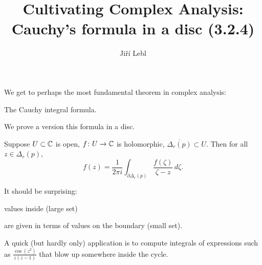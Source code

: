 \documentclass[10pt,aspectratio=169]{beamer}
\author{Ji\v{r}\'i Lebl}
\institute[OSU]{%
Departemento pri Matematiko de Oklahoma {\^S}tata Universitato}
\title{Cultivating Complex Analysis:\\%
Cauchy's formula in a disc (3.2.4)}
\date{}
\begin{document}
\begin{frame}
\titlepage
\end{frame}

\begin{frame}

We get to perhaps the most fundamental theorem in complex analysis:

The Cauchy integral formula.

\pause
\medskip

We prove a version this formula in a disc.

\pause
\medskip

\begin{theorem}
Suppose $U \subset {\mathbb{C}}$ is open, $f \colon U \to {\mathbb{C}}$ is holomorphic,
$\overline{\Delta_r(p)} \subset U$.
Then for all $z \in \Delta_r(p)$,
\begin{equation*}
f(z)
=
\frac{1}{2\pi i}
\int_{\partial \Delta_r(p)}
\frac{f(\zeta)}{\zeta-z}
\,
d \zeta .
\end{equation*}
\end{theorem}

\medskip
\pause

It should be surprising:
\pause

values inside (large set)

\pause
are given in terms of values on the boundary (small set).

\medskip
\pause

A quick (but hardly only) application is to compute integrals of expressions
such as $\frac{\cos(z^2)}{z(z-1)}$
that blow up somewhere inside the cycle.

\end{frame}
\end{document}
